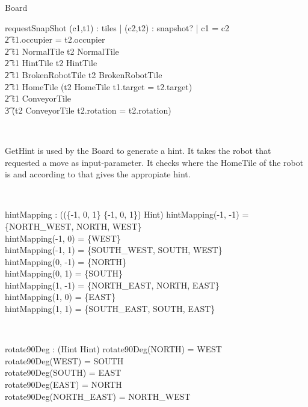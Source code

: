 \documentclass[12pt]{article}
\begin{document}
\begin{class}{Board}
\begin{schema}{requestSnapShot}
\forall (c1,t1) : tiles | \exists (c2,t2) : snapshot? | c1 = c2 \: \wedge \\ \t2
t1.occupier = t2.occupier \: \wedge \\ \t2 
t1 \in NormalTile \Rightarrow t2 \in NormalTile \: \wedge \\ \t2
t1 \in HintTile \Rightarrow t2 \in HintTile \: \wedge \\ \t2
t1 \in BrokenRobotTile \Rightarrow t2 \in BrokenRobotTile \: \wedge \\ \t2
t1 \in HomeTile \Rightarrow (t2 \in HomeTile \wedge t1.target = t2.target) \: \wedge \\ \t2 
t1 \in ConveyorTile \Rightarrow \\ \t3 (t2 \in ConveyorTile \wedge t2.rotation = t2.rotation)
\end{schema} \\
\znewpage
\begin{classcom}
GetHint is used by the Board to generate a hint. It takes the robot that requested a move as input-parameter. It checks where the HomeTile of the robot is and according to that gives the appropiate hint.
\end{classcom} \\
\begin{axdef}
hintMapping : \power ((\{-1, 0, 1\} \cross \{-1, 0, 1\}) \pfun \power Hint)
\where
hintMapping(-1, -1) = \{NORTH\_WEST, NORTH, WEST\} \\
hintMapping(-1, 0) = \{WEST\} \\
hintMapping(-1, 1) = \{SOUTH\_WEST, SOUTH, WEST\} \\
hintMapping(0, -1) = \{NORTH\} \\
hintMapping(0, 1) = \{SOUTH\} \\
hintMapping(1, -1) = \{NORTH\_EAST, NORTH, EAST\} \\
hintMapping(1, 0) = \{EAST\} \\
hintMapping(1, 1) = \{SOUTH\_EAST, SOUTH, EAST\} \\
\end{axdef} \\
\begin{axdef}
rotate90Deg : \power (Hint \fun Hint)
\where
rotate90Deg(NORTH) = WEST \\
rotate90Deg(WEST) = SOUTH \\
rotate90Deg(SOUTH) = EAST \\
rotate90Deg(EAST) = NORTH \\
rotate90Deg(NORTH\_EAST) = NORTH\_WEST \\

\end{axdef}
\end{class}
\end{document}
